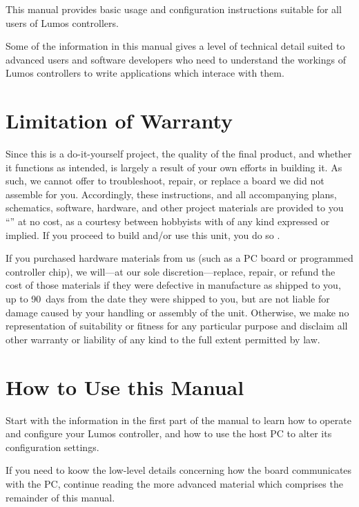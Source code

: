 \documentclass[letterpaper,twoside,onecolumn,openright,final]{memoir}
\begin{document}
This manual provides
basic usage and configuration instructions suitable for all users of
Lumos controllers.

Some of the information in this manual gives a level of technical detail suited to advanced
users and software developers who need to understand the workings of Lumos controllers
to write applications which interace with them.  

\section{Limitation of Warranty}
Since this is a do-it-yourself project, the quality of the final product, and whether it 
functions as intended, is largely a result of your own efforts in building it.  As such, we
cannot offer to troubleshoot, repair, or replace a board we did not assemble for you.  Accordingly,
these instructions, and all accompanying plans, schematics, software, hardware, and other
project materials are provided to you ``'' at no cost, as a courtesy between 
 hobbyists with  of any kind expressed or implied.  If you proceed
to build and/or use this unit, you do so .

If you purchased hardware materials from us (such as a PC board or programmed controller chip),
we will---at our sole discretion---replace, repair, or refund the cost of those materials if they were defective in manufacture
as shipped to you, up to 90~days from the date they were shipped to you,
but are not liable for damage caused by your handling or assembly of the unit.
Otherwise, we make no representation of suitability or fitness for any particular purpose and disclaim
all other warranty or liability of any kind to the full extent permitted by law.

\section{How to Use this Manual}
Start with the information in the first part of the manual to learn how to operate and configure
your Lumos controller, and how to use the host PC to alter its configuration settings.

If you need to koow the low-level details concerning how the board communicates with the PC,
continue reading the more advanced material which comprises the remainder of this manual.
\end{document}

